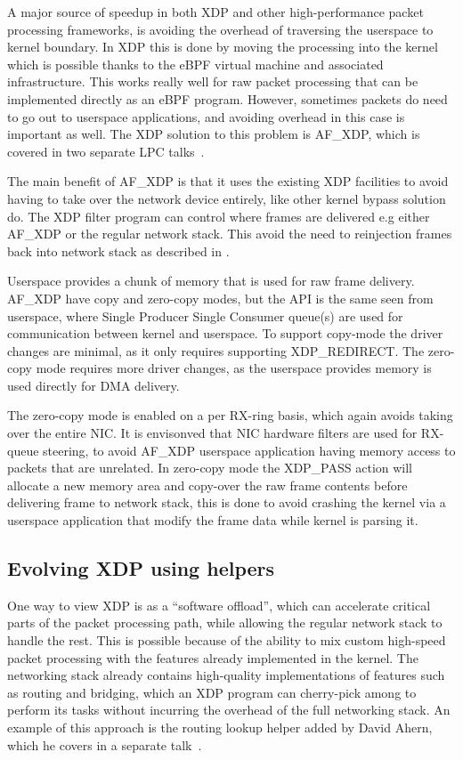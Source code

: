 \documentclass[sigconf]{acmart}
\begin{document}
A major source of speedup in both XDP and other high-performance packet
processing frameworks, is avoiding the overhead of traversing the userspace to
kernel boundary. In XDP this is done by moving the processing into the kernel
which is possible thanks to the eBPF virtual machine and associated
infrastructure. This works really well for raw packet processing that can be
implemented directly as an eBPF program. However, sometimes packets do need to
go out to userspace applications, and avoiding overhead in this case is
important as well. The XDP solution to this problem is AF\_XDP, which is covered
in two separate LPC talks~\cite{af-xdp,xdp-ovs}.

The main benefit of AF\_XDP is that it uses the existing XDP facilities to avoid
having to take over the network device entirely, like other kernel bypass
solution do. The XDP filter program can control where frames are delivered e.g
either AF\_XDP or the regular network stack.  This avoid the need to reinjection
frames back into network stack as described in \cite{cloudflare-ddos}.

Userspace provides a chunk of memory that is used for raw frame delivery.
AF\_XDP have copy and zero-copy modes, but the API is the same seen from
userspace, where Single Producer Single Consumer queue(s) are used for
communication between kernel and userspace. To support copy-mode the driver
changes are minimal, as it only requires supporting XDP\_REDIRECT.  The
zero-copy mode requires more driver changes, as the userspace provides memory is
used directly for DMA delivery.

The zero-copy mode is enabled on a per RX-ring basis, which again avoids taking
over the entire NIC. It is envisonved that NIC hardware filters are used for
RX-queue steering, to avoid AF\_XDP userspace application having memory access
to packets that are unrelated.  In zero-copy mode the XDP\_PASS action will
allocate a new memory area and copy-over the raw frame contents before
delivering frame to network stack, this is done to avoid crashing the kernel via
a userspace application that modify the frame data while kernel is parsing it.


\subsection{Evolving XDP using helpers}
\label{sec:evolving-xdp}

One way to view XDP is as a ``software offload'', which can accelerate critical
parts of the packet processing path, while allowing the regular network stack to
handle the rest. This is possible because of the ability to mix custom
high-speed packet processing with the features already implemented in the
kernel. The networking stack already contains high-quality implementations of
features such as routing and bridging, which an XDP program can cherry-pick
among to perform its tasks without incurring the overhead of the full networking
stack. An example of this approach is the routing lookup helper added by David
Ahern, which he covers in a separate talk~\cite{ahern-routing}.
\end{document}
